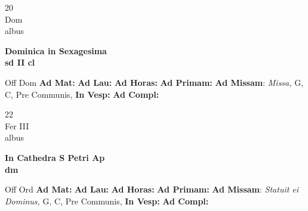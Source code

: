 \documentclass[10pt, openany]{book}
\begin{document}
    \begin{center}
        \begin{minipage}{3.5in}
            \vspace{2em}
            \begin{minipage}{0.5in}
                {\Huge 20} \\
                {\normalsize Dom} \\
                {\normalsize albus}
            \end{minipage}
            \begin{minipage}{3.0in}
                \textbf{ \large Dominica in Sexagesima \\
                \textnormal{\normalsize sd II cl}} \\ 
            \end{minipage}
            \begin{justify}Off Dom
                \textbf{Ad Mat: }
                \textbf{Ad Lau: }
                \textbf{Ad Horas: }
                \textbf{Ad Primam: }\textbf{Ad Missam}: \textit{Missa,} G, C, Pre Communis,  
                \textbf{In Vesp: }
                \textbf{Ad Compl: }
            \end{justify}
        \end{minipage}
    \end{center}

    \begin{center}
        \begin{minipage}{3.5in}
            \vspace{2em}
            \begin{minipage}{0.5in}
                {\Huge 22} \\
                {\normalsize Fer III} \\
                {\normalsize albus}
            \end{minipage}
            \begin{minipage}{3.0in}
                \textbf{ \large In Cathedra S Petri Ap \\
                \textnormal{\normalsize dm}} \\ 
            \end{minipage}
            \begin{justify}Off Ord
                \textbf{Ad Mat: }
                \textbf{Ad Lau: }
                \textbf{Ad Horas: }
                \textbf{Ad Primam: }\textbf{Ad Missam}: \textit{Statuit ei Dominus,} G, C, Pre Communis,  
                \textbf{In Vesp: }
                \textbf{Ad Compl: }
            \end{justify}
        \end{minipage}
    \end{center}
\end{document}

